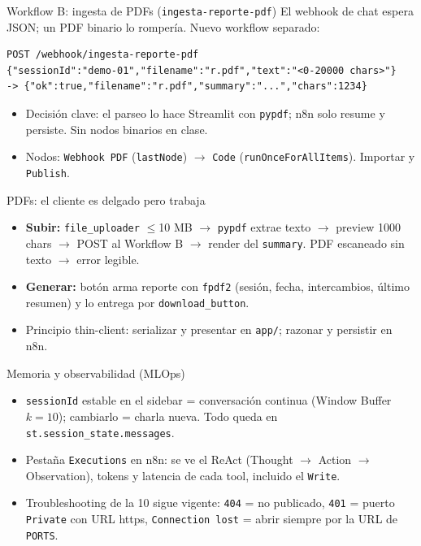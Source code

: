 \documentclass[aspectratio=169,11pt]{beamer}
\begin{document}
\begin{frame}[fragile]{Workflow B: ingesta de PDFs (\texttt{ingesta-reporte-pdf})}
  El webhook de chat espera JSON; un PDF binario lo rompería. Nuevo workflow separado:
\begin{lstlisting}
POST /webhook/ingesta-reporte-pdf
{"sessionId":"demo-01","filename":"r.pdf","text":"<0-20000 chars>"}
-> {"ok":true,"filename":"r.pdf","summary":"...","chars":1234}
\end{lstlisting}
  \begin{itemize}
    \item Decisión clave: el parseo lo hace Streamlit con \texttt{pypdf}; n8n solo resume y persiste. Sin nodos binarios en clase.
    \item Nodos: \texttt{Webhook PDF} (\texttt{lastNode}) $\to$ \texttt{Code} (\texttt{runOnceForAllItems}). Importar y \texttt{Publish}.
  \end{itemize}
\end{frame}

\begin{frame}{PDFs: el cliente es delgado pero trabaja}
  \begin{itemize}
    \item \textbf{Subir:} \texttt{file\_uploader} $\le$10 MB $\to$ \texttt{pypdf} extrae texto $\to$ preview 1000 chars $\to$ POST al Workflow B $\to$ render del \texttt{summary}. PDF escaneado sin texto $\to$ error legible.
    \item \textbf{Generar:} botón arma reporte con \texttt{fpdf2} (sesión, fecha, intercambios, último resumen) y lo entrega por \texttt{download\_button}.
    \item Principio thin-client: serializar y presentar en \texttt{app/}; razonar y persistir en n8n.
  \end{itemize}
\end{frame}

\begin{frame}{Memoria y observabilidad (MLOps)}
  \begin{itemize}
    \item \texttt{sessionId} estable en el sidebar = conversación continua (Window Buffer $k=10$); cambiarlo = charla nueva. Todo queda en \texttt{st.session\_state.messages}.
    \item Pestaña \texttt{Executions} en n8n: se ve el ReAct (Thought $\to$ Action $\to$ Observation), tokens y latencia de cada tool, incluido el \texttt{Write}.
    \item Troubleshooting de la 10 sigue vigente: \texttt{404} = no publicado, \texttt{401} = puerto \texttt{Private} con URL https, \texttt{Connection lost} = abrir siempre por la URL de \texttt{PORTS}.
  \end{itemize}
\end{frame}
\end{document}
